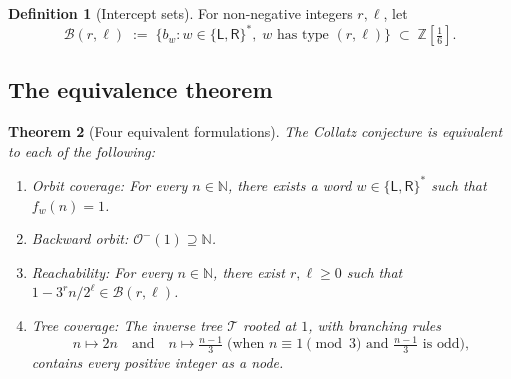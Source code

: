 \documentclass[12pt, a4paper]{amsart}
\theoremstyle{plain}
\newtheorem{theorem}{Theorem}[section]
\theoremstyle{definition}
\newtheorem{definition}[theorem]{Definition}
\theoremstyle{remark}
\newcommand{\N}{\mathbb{N}}
\newcommand{\Z}{\mathbb{Z}}
\newcommand{\Zs}{\Z[\tfrac{1}{6}]}
\newcommand{\wL}{\mathsf{L}}
\newcommand{\wR}{\mathsf{R}}
\begin{document}
\begin{definition}[Intercept sets]
  \label{def:intercepts}
  For non-negative integers $r,\ell$, let
  \[
    \mathcal{B}(r,\ell) \;:=\;
    \bigl\{b_w : w\in\{\wL,\wR\}^*,\; w\text{ has type }(r,\ell)\bigr\}
    \;\subset\;\Zs.
  \]
\end{definition}

\subsection{The equivalence theorem}

\begin{theorem}[Four equivalent formulations]
  \label{thm:equiv}
  The Collatz conjecture is equivalent to each of the following:
  \begin{enumerate}[label=\textup{(\Alph*)}]
    \item\label{it:A}
      \emph{Orbit coverage}: For every $n\in\N$, there exists a word
      $w\in\{\wL,\wR\}^*$ such that $f_w(n)=1$.
    \item\label{it:B}
      \emph{Backward orbit}: $\mathcal{O}^-(1)\supseteq\N$.
    \item\label{it:C}
      \emph{Reachability}: For every $n\in\N$, there exist $r,\ell\geq 0$
      such that $1-3^r n/2^\ell \in \mathcal{B}(r,\ell)$.
    \item\label{it:D}
      \emph{Tree coverage}: The inverse tree $\mathcal{T}$ rooted at
      $1$, with branching rules
      \[
        n\mapsto 2n \quad\text{and}\quad
        n\mapsto\tfrac{n-1}{3}
        \;\bigl(\text{when }n\equiv 1\!\pmod{3}\text{ and }
        \tfrac{n-1}{3}\text{ is odd}\bigr),
      \]
      contains every positive integer as a node.
  \end{enumerate}
\end{theorem}
\end{document}
